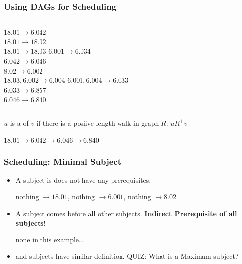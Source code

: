 \documentclass{beamer}
\begin{document}
\begin{frame}
  \frametitle{Using DAGs for Scheduling}

  \begin{columns}[T]
    $18.01 \rightarrow 6.042$\\
    $18.01 \rightarrow 18.02$\\
    $18.01 \rightarrow 18.03$
    $6.001 \rightarrow 6.034$\\
    $6.042 \rightarrow 6.046$\\
    $8.02 \rightarrow 6.002$\\
    $18.03, 6.002 \rightarrow 6.004$
    $6.001, 6.004 \rightarrow 6.033$\\
    $6.033 \rightarrow 6.857$\\
    $6.046 \rightarrow 6.840$
  \end{columns}

  \vfill

  {\larger

    $u$ is a  of $v$ if there is a
    posiive length walk in graph $R$: $u R^+ v$

    \begin{center}
      $18.01 \rightarrow 6.042 \rightarrow 6.046 \rightarrow 6.840$
    \end{center}

  }
\end{frame}

\begin{frame}
  \frametitle{Scheduling: Minimal Subject}

  {\larger
    \begin{itemize}
    \item A  subject is does not have any prerequisites.
      \begin{center}
        nothing $\rightarrow 18.01$, nothing $\rightarrow 6.001$, nothing $\rightarrow 8.02$
      \end{center}

      \bigskip

    \item A  subject comes before all other
      subjects. {\bf Indirect Prerequisite of all subjects!}
      \begin{center}
        none in this example...
      \end{center}
      \bigskip

    \item {} and  subjects have
      similar definition. \alert{QUIZ:} What is a Maximum subject?

    \end{itemize}
  }
\end{frame}
\end{document}
